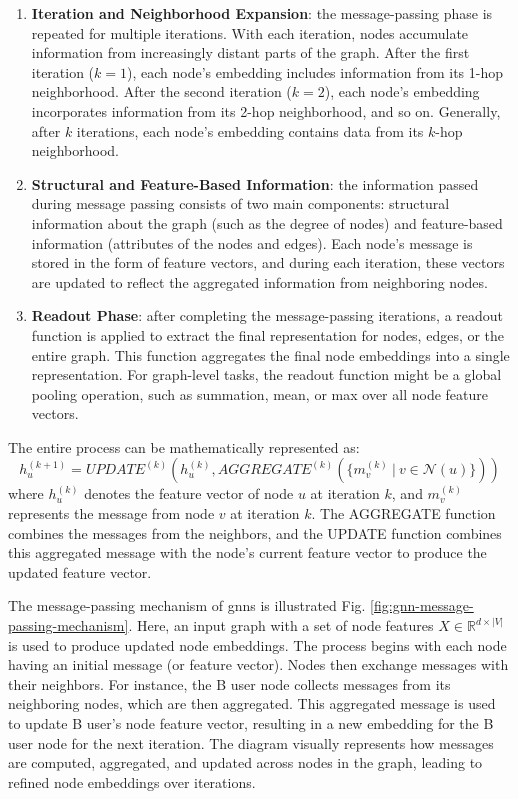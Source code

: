 \begin{enumerate}
    \item \textbf{Iteration and Neighborhood Expansion}: the message-passing phase is repeated for multiple iterations. With each iteration, nodes accumulate information from increasingly distant parts of the graph. After the first iteration (\(k=1\)), each node's embedding includes information from its 1-hop neighborhood. After the second iteration (\(k=2\)), each node's embedding incorporates information from its 2-hop neighborhood, and so on. Generally, after \(k\) iterations, each node's embedding contains data from its \(k\)-hop neighborhood.

    \item \textbf{Structural and Feature-Based Information}: the information passed during message passing consists of two main components: structural information about the graph (such as the degree of nodes) and feature-based information (attributes of the nodes and edges). Each node's message is stored in the form of feature vectors, and during each iteration, these vectors are updated to reflect the aggregated information from neighboring nodes.

    \item \textbf{Readout Phase}: after completing the message-passing iterations, a readout function is applied to extract the final representation for nodes, edges, or the entire graph. This function aggregates the final node embeddings into a single representation. For graph-level tasks, the readout function might be a global pooling operation, such as summation, mean, or max over all node feature vectors.
\end{enumerate}

The entire process can be mathematically represented as:
   \[
   h_u^{(k+1)} = UPDATE^{(k)}\left(h_u^{(k)}, AGGREGATE^{(k)}\left(\{m_{v}^{(k)}~|~v \in \mathcal{N}(u)\}\right)\right)
   \]
where \(h_u^{(k)}\) denotes the feature vector of node \(u\) at iteration \(k\), and \(m_{v}^{(k)}\) represents the message from node \(v\) at iteration \(k\). The AGGREGATE function combines the messages from the neighbors, and the UPDATE function combines this aggregated message with the node's current feature vector to produce the updated feature vector.

The message-passing mechanism of \glspl{gnn} is illustrated Fig. \ref{fig:gnn-message-passing-mechanism}.
Here, an input graph with a set of node features \(X \in \mathbb{R}^{d \times |V|}\) is used to produce updated node embeddings.
The process begins with each node having an initial message (or feature vector).
Nodes then exchange messages with their neighbors. For instance, the B user node collects messages from its neighboring nodes, which are then aggregated.
This aggregated message is used to update B user's node feature vector, resulting in a new embedding for the B user node for the next iteration.
The diagram visually represents how messages are computed, aggregated, and updated across nodes in the graph, leading to refined node embeddings over iterations.

